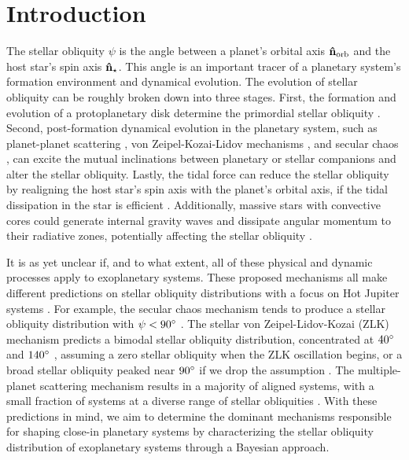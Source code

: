 \documentclass[twocolumn,times]{aastex631}
\begin{document}

\section{Introduction}
\label{sec:intro}

The stellar obliquity $\psi$ is the angle between a planet's orbital axis $\vb{\hat{n}_{\rm orb}}$ and the host star's spin axis $\vb{\hat{n}_\star}$. 
This angle is an important tracer of a planetary system's formation environment and dynamical evolution. The evolution of stellar obliquity can be roughly broken down into three stages. First, the formation and evolution of a protoplanetary disk determine the primordial stellar obliquity \citep[e.g.,][]{Bate10, Lai11, Batygin12}. Second, post-formation dynamical evolution in the planetary system, such as planet-planet scattering \citep[e.g.,][]{Rasio96, Chatterjee08, Nagasawa08, Beague12}, von Zeipel-Kozai-Lidov mechanisms \citep[e.g.,][]{Wu03, Naoz16}, and secular chaos \citep{Wu11}, can excite the mutual inclinations between planetary or stellar companions and alter the stellar obliquity. Lastly, the tidal force can reduce the stellar obliquity by realigning the host star's spin axis with the planet's orbital axis, if the tidal dissipation in the star is efficient \citep[e.g.,][]{Winn10, Albrecht12}. Additionally, massive stars with convective cores could generate internal gravity waves and dissipate angular momentum to their radiative zones, potentially affecting the stellar obliquity \citep{Rogers12, Rogers13}.

It is as yet unclear if, and to what extent, all of these physical and dynamic processes apply to exoplanetary systems. These proposed mechanisms all make different predictions on stellar obliquity distributions with a focus on Hot Jupiter systems \citep[see][and references therein]{Albrecht22, Dawson18}. For example, the secular chaos mechanism tends to produce a stellar obliquity distribution with $\psi < 90\mbox{$^\circ$}$ \citep[e.g.,][]{Teyssandier19}. The stellar von Zeipel-Lidov-Kozai (ZLK) mechanism predicts a bimodal stellar obliquity distribution, concentrated at $40\mbox{$^\circ$}$ and $140\mbox{$^\circ$}$ \citep[e.g.,][]{Fabrycky07, Anderson16, Vick19}, assuming a zero stellar obliquity when the ZLK oscillation begins, or a broad stellar obliquity peaked near $90\mbox{$^\circ$}$ if we drop the assumption \citep{Vick23}. The multiple-planet scattering mechanism results in a majority of aligned systems, with a small fraction of systems at a diverse range of stellar obliquities \citep[e.g.,][]{Beague12}. 
With these predictions in mind, we aim to determine the dominant mechanisms responsible for shaping close-in planetary systems by characterizing the stellar obliquity distribution of exoplanetary systems through a Bayesian approach.
\end{document}
